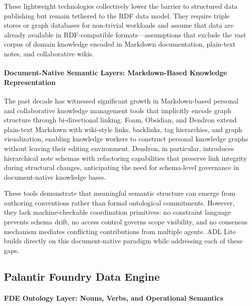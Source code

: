 These lightweight technologies collectively lower the barrier to structured data publishing but remain tethered to the RDF data model. They require triple stores or graph databases for non-trivial workloads and assume that data are already available in RDF-compatible formats---assumptions that exclude the vast corpus of domain knowledge encoded in Markdown documentation, plain-text notes, and collaborative wikis.

\paragraph{Document-Native Semantic Layers: Markdown-Based Knowledge Representation}\label{document-native-semantic-layers-markdown-based-knowledge-representation}

The past decade has witnessed significant growth in Markdown-based personal and collaborative knowledge management tools that implicitly encode graph structure through bi-directional linking. Foam\cite{ref15}, Obsidian\cite{ref16}, and Dendron\cite{ref17} extend plain-text Markdown with wiki-style links, backlinks, tag hierarchies, and graph visualization, enabling knowledge workers to construct personal knowledge graphs without leaving their editing environment. Dendron, in particular, introduces hierarchical note schemas with refactoring capabilities that preserve link integrity during structural changes\cite{ref18}, anticipating the need for schema-level governance in document-native knowledge bases.

These tools demonstrate that meaningful semantic structure can emerge from authoring conventions rather than formal ontological commitments. However, they lack machine-checkable coordination primitives: no constraint language prevents schema drift, no access control governs scope visibility, and no consensus mechanism mediates conflicting contributions from multiple agents. ADL Lite builds directly on this document-native paradigm while addressing each of these gaps.

\subsection{Palantir Foundry Data Engine}\label{palantir-foundry-data-engine}

\paragraph{FDE Ontology Layer: Nouns, Verbs, and Operational Semantics}\label{fde-ontology-layer-nouns-verbs-and-operational-semantics}

